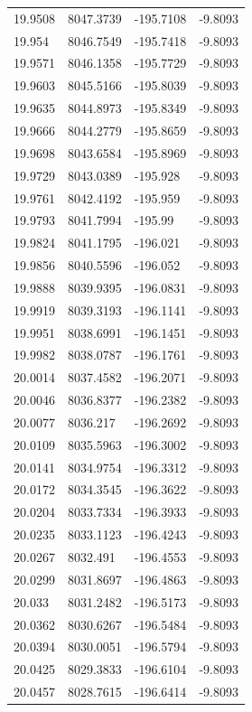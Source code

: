 \begin{table}[H]
\begin{tabular}{llll}
19.9508 & 8047.3739 & -195.7108 & -9.8093 \\
19.954 & 8046.7549 & -195.7418 & -9.8093 \\
19.9571 & 8046.1358 & -195.7729 & -9.8093 \\
19.9603 & 8045.5166 & -195.8039 & -9.8093 \\
19.9635 & 8044.8973 & -195.8349 & -9.8093 \\
19.9666 & 8044.2779 & -195.8659 & -9.8093 \\
19.9698 & 8043.6584 & -195.8969 & -9.8093 \\
19.9729 & 8043.0389 & -195.928 & -9.8093 \\
19.9761 & 8042.4192 & -195.959 & -9.8093 \\
19.9793 & 8041.7994 & -195.99 & -9.8093 \\
19.9824 & 8041.1795 & -196.021 & -9.8093 \\
19.9856 & 8040.5596 & -196.052 & -9.8093 \\
19.9888 & 8039.9395 & -196.0831 & -9.8093 \\
19.9919 & 8039.3193 & -196.1141 & -9.8093 \\
19.9951 & 8038.6991 & -196.1451 & -9.8093 \\
19.9982 & 8038.0787 & -196.1761 & -9.8093 \\
20.0014 & 8037.4582 & -196.2071 & -9.8093 \\
20.0046 & 8036.8377 & -196.2382 & -9.8093 \\
20.0077 & 8036.217 & -196.2692 & -9.8093 \\
20.0109 & 8035.5963 & -196.3002 & -9.8093 \\
20.0141 & 8034.9754 & -196.3312 & -9.8093 \\
20.0172 & 8034.3545 & -196.3622 & -9.8093 \\
20.0204 & 8033.7334 & -196.3933 & -9.8093 \\
20.0235 & 8033.1123 & -196.4243 & -9.8093 \\
20.0267 & 8032.491 & -196.4553 & -9.8093 \\
20.0299 & 8031.8697 & -196.4863 & -9.8093 \\
20.033 & 8031.2482 & -196.5173 & -9.8093 \\
20.0362 & 8030.6267 & -196.5484 & -9.8093 \\
20.0394 & 8030.0051 & -196.5794 & -9.8093 \\
20.0425 & 8029.3833 & -196.6104 & -9.8093 \\
20.0457 & 8028.7615 & -196.6414 & -9.8093 \\

\end{tabular}
\end{table}
